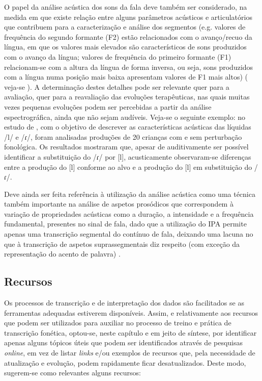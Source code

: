 \documentclass[output=paper,colorlinks,citecolor=brown,booklanguage=portuguese]{langscibook}
\begin{document}
O papel da análise acústica dos sons da fala deve também ser considerado, na medida em que existe relação entre alguns parâmetros acústicos e articulatórios que contribuem para a caracterização e análise dos segmentos (e.g. valores de frequência do segundo formante (F2) estão relacionados com o avanço/recuo da língua, em que os valores mais elevados são característicos de sons produzidos com o avanço da língua; valores de frequência do primeiro formante (F1) relacionam-se com a altura da língua de forma inversa, ou seja, sons produzidos com a língua numa posição mais baixa apresentam valores de F1 mais altos) (\citealp{Kent2002, Mateus2016} veja-se ). A determinação destes detalhes pode ser relevante quer para a avaliação, quer para a reavaliação das evoluções terapêuticas, nas quais muitas vezes pequenas evoluções podem ser percebidas a partir da análise espectrográfica, ainda que não sejam audíveis. Veja-se o seguinte exemplo:  no estudo de \citet{PaganNeves2010}, com o objetivo de descrever as características acústicas das líquidas /l/ e /ɾ/, foram analisadas produções de 20 crianças com e sem perturbação fonológica. Os resultados mostraram que, apesar de auditivamente ser possível identificar a substituição do /ɾ/ por [l], acusticamente observaram-se diferenças entre a produção do [l] conforme ao alvo e a produção do [l] em substituição do /ɾ/. 

Deve ainda ser feita referência à utilização da análise acústica como uma técnica também importante na análise de aspetos prosódicos que correspondem à variação de propriedades acústicas como a duração, a intensidade e a frequência fundamental, presentes no sinal de fala, dado que a utilização do IPA permite apenas uma transcrição segmental do contínuo de fala, deixando uma lacuna no que à transcrição de aspetos suprassegmentais diz respeito (com exceção da representação do acento de palavra) \citep{Mateus2016}.

\subsection{Recursos}
Os processos de transcrição e de interpretação dos dados são facilitados se as ferramentas adequadas estiverem disponíveis. Assim, e relativamente aos recursos que podem ser utilizados para auxiliar no processo de treino e prática de transcrição fonética, optou-se, neste capítulo e em jeito de síntese, por identificar apenas alguns tópicos úteis que podem ser identificados através de pesquisas \emph{online}, em vez de listar \emph{links} e/ou exemplos de recursos que, pela necessidade de atualização e evolução, podem rapidamente ficar desatualizados. Deste modo, sugerem-se como relevantes alguns recursos:
\end{document}
